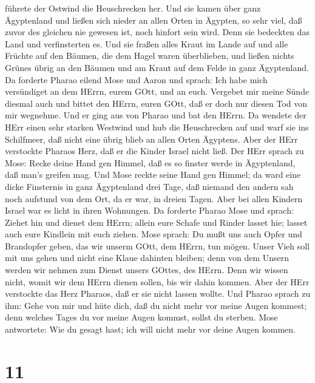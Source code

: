 führete der Ostwind die Heuschrecken her.  Und sie kamen
über ganz Ägyptenland und ließen sich nieder an allen Orten in Ägypten,
so sehr viel, daß zuvor des gleichen nie gewesen ist, noch hinfort sein
wird.  Denn sie bedeckten das Land und verfinsterten es.
Und sie fraßen alles Kraut im Lande auf und alle Früchte auf den Bäumen,
die dem Hagel waren überblieben, und ließen nichts Grünes übrig an den
Bäumen und am Kraut auf dem Felde in ganz Ägyptenland.  Da
forderte Pharao eilend Mose und Aaron und sprach: Ich habe mich
versündiget an dem HErrn, eurem GOtt, und an euch. 
Vergebet mir meine Sünde diesmal auch und bittet den HErrn, euren GOtt,
daß er doch nur diesen Tod von mir wegnehme.  Und er ging
aus von Pharao und bat den HErrn.  Da wendete der HErr
einen sehr starken Westwind und hub die Heuschrecken auf und warf sie
ins Schilfmeer, daß nicht eine übrig blieb an allen Orten Ägyptens.
 Aber der HErr verstockte Pharaos Herz, daß er die Kinder
Israel nicht ließ.  Der HErr sprach zu Mose: Recke deine
Hand gen Himmel, daß es so finster werde in Ägyptenland, daß man's
greifen mag.  Und Mose reckte seine Hand gen Himmel; da
ward eine dicke Finsternis in ganz Ägyptenland drei Tage, 
daß niemand den andern sah noch aufstund von dem Ort, da er war, in
dreien Tagen. Aber bei allen Kindern Israel war es licht in ihren
Wohnungen.  Da forderte Pharao Mose und sprach: Ziehet hin
und dienet dem HErrn; allein eure Schafe und Rinder lasset hie; lasset
auch eure Kindlein mit euch ziehen.  Mose sprach: Du mußt
uns auch Opfer und Brandopfer geben, das wir unserm GOtt, dem HErrn, tun
mögen.  Unser Vieh soll mit uns gehen und nicht eine Klaue
dahinten bleiben; denn von dem Unsern werden wir nehmen zum Dienst
unsers GOttes, des HErrn. Denn wir wissen nicht, womit wir dem HErrn
dienen sollen, bis wir dahin kommen.  Aber der HErr
verstockte das Herz Pharaos, daß er sie nicht lassen wollte.
 Und Pharao sprach zu ihm: Gehe von mir und hüte dich, daß
du nicht mehr vor meine Augen kommest; denn welches Tages du vor meine
Augen kommst, sollst du sterben.  Mose antwortete: Wie du
gesagt hast; ich will nicht mehr vor deine Augen kommen.

\hypertarget{section-10}{%
\section{11}\label{section-10}}

